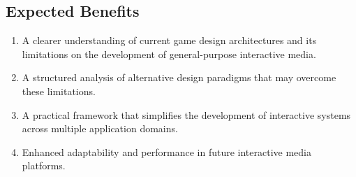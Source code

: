 \subsection{Expected Benefits}
\label{subsec:expected-benefits}

\begin{enumerate}
    \item A clearer understanding of current game design architectures and its limitations on the development of general-purpose interactive media.
    \item A structured analysis of alternative design paradigms that may overcome these limitations.
    \item A practical framework that simplifies the development of interactive systems across multiple application domains.
    \item Enhanced adaptability and performance in future interactive media platforms.
\end{enumerate}